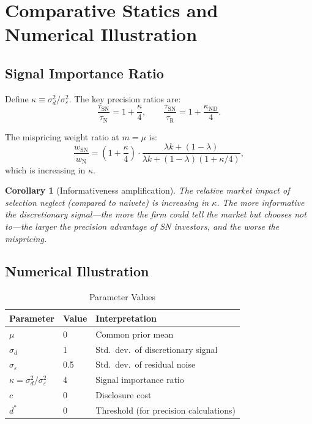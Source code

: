 \documentclass[12pt]{article}
\theoremstyle{plain}
\newtheorem{corollary}[proposition]{Corollary}
\theoremstyle{definition}
\newcommand{\ND}{\mathrm{ND}}
\newcommand{\R}{\mathrm{R}}
\newcommand{\SN}{\mathrm{SN}}
\newcommand{\N}{\mathrm{N}}
\begin{document}
\section{Comparative Statics and Numerical Illustration}
\label{sec:comparative}

\subsection{Signal Importance Ratio}

Define $\kappa \equiv \sigma_d^2/\sigma_\varepsilon^2$. The key precision ratios are:
\begin{equation}
\frac{\tau_\SN}{\tau_\N} = 1 + \frac{\kappa}{4}, \qquad \frac{\tau_\SN}{\tau_\R} = 1 + \frac{\kappa_{\ND}}{4}.
\label{eq:precision_ratios}
\end{equation}

The mispricing weight ratio at $m = \mu$ is:
\begin{equation}
\frac{w_\SN}{w_\N} = \left(1 + \frac{\kappa}{4}\right) \cdot \frac{\lambda k + (1-\lambda)}{\lambda k + (1-\lambda)(1 + \kappa/4)},
\end{equation}
which is increasing in $\kappa$.

\begin{corollary}[Informativeness amplification]
\label{cor:kappa}
The relative market impact of selection neglect (compared to naivete) is increasing in $\kappa$. The more informative the discretionary signal---the more the firm could tell the market but chooses not to---the larger the precision advantage of SN investors, and the worse the mispricing.
\end{corollary}


\subsection{Numerical Illustration}

\begin{table}[h!]
\centering
\caption{Parameter Values}
\label{tab:params}
\begin{tabular}{lll}
\toprule
Parameter & Value & Interpretation \\
\midrule
$\mu$ & 0 & Common prior mean \\
$\sigma_d$ & 1 & Std.\ dev.\ of discretionary signal \\
$\sigma_\varepsilon$ & 0.5 & Std.\ dev.\ of residual noise \\
$\kappa = \sigma_d^2/\sigma_\varepsilon^2$ & 4 & Signal importance ratio \\
$c$ & 0 & Disclosure cost \\
$d^*$ & 0 & Threshold (for precision calculations) \\
\bottomrule
\end{tabular}
\end{table}
\end{document}
